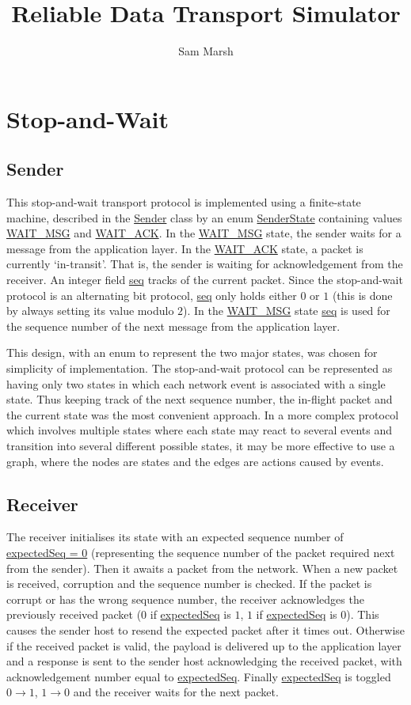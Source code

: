 \documentclass[a4paper]{article}
\title{\vspace{-5ex}Reliable Data Transport Simulator}
\author{Sam Marsh}
\date{}
\newcommand{\code}{\url}
\begin{document}
\maketitle
\vspace{-4ex}

\section{Stop-and-Wait}

\subsection{Sender}

This stop-and-wait transport protocol is implemented using a finite-state machine, described in the \code{Sender} class by an enum \code{SenderState} containing values \code{WAIT_MSG} and \code{WAIT_ACK}. In the \code{WAIT_MSG} state, the sender waits for a message from the application layer. In the \code{WAIT_ACK} state, a packet is currently `in-transit'. That is, the sender is waiting for acknowledgement from the receiver. An integer field \code{seq} tracks of the current packet. Since the stop-and-wait protocol is an alternating bit protocol, \code{seq} only holds either $0$ or $1$ (this is done by always setting its value modulo $2$). In the \code{WAIT_MSG} state \code{seq} is used for the sequence number of the next message from the application layer. 

This design, with an enum to represent the two major states, was chosen for simplicity of implementation. The stop-and-wait protocol can be represented as having only two states in which each network event is associated with a single state. Thus keeping track of the next sequence number, the in-flight packet and the current state was the most convenient approach. In a more complex protocol which involves multiple states where each state may react to several events and transition into several different possible states, it may be more effective to use a graph, where the nodes are states and the edges are actions caused by events.

\subsection{Receiver}

The receiver initialises its state with an expected sequence number of \code{expectedSeq = 0} (representing the sequence number of the packet required next from the sender). Then it awaits a packet from the network. When a new packet is received, corruption and the sequence number is checked. If the packet is corrupt or has the wrong sequence number, the receiver acknowledges the previously received packet ($0$ if \code{expectedSeq} is $1$, $1$ if \code{expectedSeq} is $0$). This causes the sender host to resend the expected packet after it times out. Otherwise if the received packet is valid, the payload is delivered up to the application layer and a response is sent to the sender host acknowledging the received packet, with acknowledgement number equal to \code{expectedSeq}. Finally \code{expectedSeq} is toggled $0 \rightarrow 1$, $1 \rightarrow 0$ and the receiver waits for the next packet.
\end{document}
